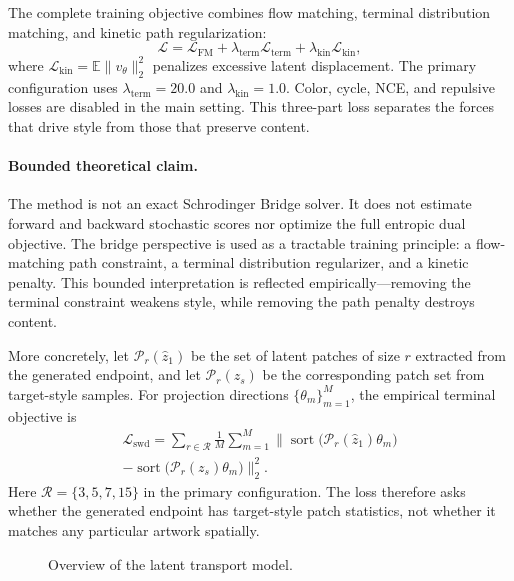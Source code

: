 ﻿\documentclass[letterpaper]{article}
\begin{document}
The complete training objective combines flow matching, terminal distribution matching, and kinetic path regularization:
\begin{equation}
    \mathcal{L} = \mathcal{L}_{\mathrm{FM}} + \lambda_{\mathrm{term}}\mathcal{L}_{\mathrm{term}} + \lambda_{\mathrm{kin}}\mathcal{L}_{\mathrm{kin}},
\end{equation}
where $\mathcal{L}_{\mathrm{kin}} = \mathbb{E}\|v_\theta\|_2^2$ penalizes excessive latent displacement. The primary configuration uses $\lambda_{\mathrm{term}}=20.0$ and $\lambda_{\mathrm{kin}}=1.0$. Color, cycle, NCE, and repulsive losses are disabled in the main setting. This three-part loss separates the forces that drive style from those that preserve content.

\paragraph{Bounded theoretical claim.}
The method is not an exact Schrodinger Bridge solver. It does not estimate forward and backward stochastic scores nor optimize the full entropic dual objective. The bridge perspective is used as a tractable training principle: a flow-matching path constraint, a terminal distribution regularizer, and a kinetic penalty. This bounded interpretation is reflected empirically---removing the terminal constraint weakens style, while removing the path penalty destroys content.

More concretely, let $\mathcal{P}_r(\hat{z}_1)$ be the set of latent patches of size $r$ extracted from the generated endpoint, and let $\mathcal{P}_r(z_s)$ be the corresponding patch set from target-style samples. For projection directions $\{\theta_m\}_{m=1}^M$, the empirical terminal objective is
\begin{multline}
    \mathcal{L}_{\mathrm{swd}} =
    \sum_{r\in\mathcal{R}} \frac{1}{M} \sum_{m=1}^{M}
    \bigl\|
    \operatorname{sort}\!\bigl(\mathcal{P}_r(\hat{z}_1)\theta_m\bigr) \\
    -
    \operatorname{sort}\!\bigl(\mathcal{P}_r(z_s)\theta_m\bigr)
    \bigr\|_2^2 .
\end{multline}
Here $\mathcal{R}=\{3,5,7,15\}$ in the primary configuration. The loss therefore asks whether the generated endpoint has target-style patch statistics, not whether it matches any particular artwork spatially.



\begin{figure}[t]
    \centering
    \vspace{-0.5cm}
    \resizebox{0.88\columnwidth}{!}{}
    \caption{Overview of the latent transport model.}
    \label{fig:framework}
\end{figure}
\end{document}
